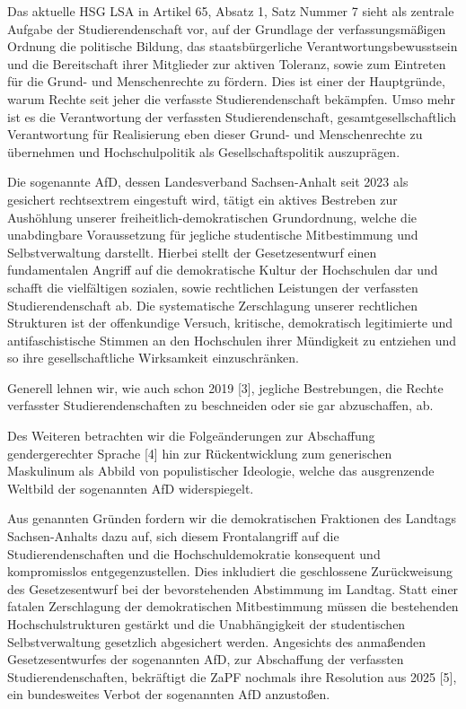 \documentclass[DIV=calc]{scrartcl}
\let\oldgrqq=\grqq
\def\grqq{\oldgrqq\xspace}
\begin{document}
Das aktuelle HSG LSA in Artikel 65, Absatz 1, Satz Nummer 7 sieht als zentrale Aufgabe der Studierendenschaft vor, \glqq auf der Grundlage der verfassungsmäßigen Ordnung die politische Bildung, das staatsbürgerliche Verantwortungsbewusstsein und die Bereitschaft ihrer Mitglieder zur aktiven Toleranz, sowie zum Eintreten für die Grund- und Menschenrechte zu fördern.\grqq{}
Dies ist einer der Hauptgründe, warum Rechte seit jeher
die verfasste Studierendenschaft bekämpfen. Umso mehr ist es die Verantwortung der verfassten Studierendenschaft, gesamtgesellschaftlich Verantwortung für Realisierung eben dieser Grund- und Menschenrechte zu übernehmen und Hochschulpolitik als Gesellschaftspolitik auszuprägen.

Die sogenannte AfD, dessen Landesverband Sachsen-Anhalt seit 2023 als gesichert rechtsextrem eingestuft wird, tätigt ein aktives Bestreben zur Aushöhlung unserer freiheitlich-demokratischen Grundordnung, welche die unabdingbare Voraussetzung für jegliche studentische Mitbestimmung und Selbstverwaltung darstellt. Hierbei stellt der Gesetzesentwurf einen fundamentalen Angriff auf die demokratische Kultur der Hochschulen dar und schafft die vielfältigen sozialen, sowie rechtlichen Leistungen der verfassten Studierendenschaft ab. Die systematische Zerschlagung unserer rechtlichen Strukturen ist der offenkundige Versuch, kritische, demokratisch legitimierte und antifaschistische Stimmen an den Hochschulen ihrer Mündigkeit zu entziehen und so ihre gesellschaftliche Wirksamkeit einzuschränken.

Generell lehnen wir, wie auch schon 2019 [3], jegliche Bestrebungen, die Rechte verfasster Studierendenschaften zu beschneiden oder sie gar abzuschaffen, ab.

Des Weiteren betrachten wir die Folgeänderungen zur Abschaffung gendergerechter Sprache [4] hin zur Rückentwicklung zum generischen Maskulinum als Abbild von
populistischer Ideologie, welche das ausgrenzende Weltbild der sogenannten AfD widerspiegelt.

Aus genannten Gründen fordern wir die demokratischen Fraktionen des Landtags Sachsen-Anhalts dazu auf, sich diesem Frontalangriff auf die Studierendenschaften und die Hochschuldemokratie konsequent und kompromisslos entgegenzustellen. Dies inkludiert die geschlossene Zurückweisung des Gesetzesentwurf bei der bevorstehenden Abstimmung im Landtag. Statt einer fatalen Zerschlagung der demokratischen Mitbestimmung müssen die bestehenden Hochschulstrukturen gestärkt und die Unabhängigkeit der studentischen Selbstverwaltung gesetzlich abgesichert werden.
Angesichts des anmaßenden Gesetzesentwurfes der
sogenannten AfD, zur Abschaffung der verfassten Studierendenschaften, bekräftigt die ZaPF nochmals ihre Resolution aus 2025 [5], ein bundesweites Verbot der sogenannten AfD anzustoßen.\\
\end{document}
